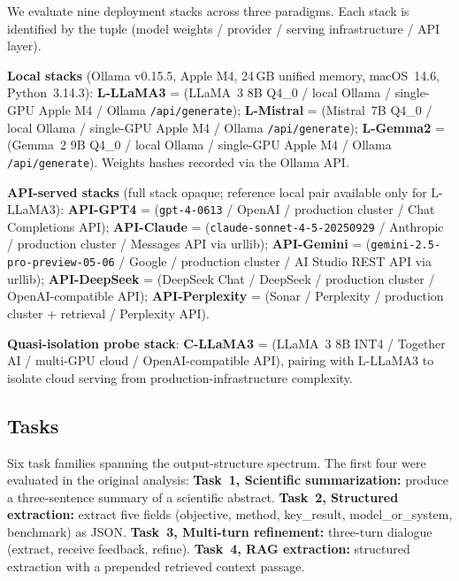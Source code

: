 \documentclass[sn-nature]{sn-jnl}
\begin{document}
We evaluate nine deployment stacks across three paradigms.
Each stack is identified by the tuple (model weights / provider / serving infrastructure / API layer).

\textbf{Local stacks} (Ollama v0.15.5, Apple M4, 24\,GB unified memory, macOS~14.6, Python~3.14.3):
\textbf{L-LLaMA3} = (LLaMA~3 8B Q4\_0\cite{grattafiori2024llama3} / local Ollama / single-GPU Apple M4 / Ollama \texttt{/api/generate});
\textbf{L-Mistral} = (Mistral~7B Q4\_0\cite{jiang2023mistral} / local Ollama / single-GPU Apple M4 / Ollama \texttt{/api/generate});
\textbf{L-Gemma2} = (Gemma~2 9B Q4\_0\cite{team2024gemma} / local Ollama / single-GPU Apple M4 / Ollama \texttt{/api/generate}).
Weights hashes recorded via the Ollama API.

\textbf{API-served stacks} (full stack opaque; reference local pair available only for L-LLaMA3):
\textbf{API-GPT4} = (\texttt{gpt-4-0613}\cite{achiam2023gpt4} / OpenAI / production cluster / Chat Completions API);
\textbf{API-Claude} = (\texttt{claude-sonnet-4-5-20250929}\cite{anthropic2024claude} / Anthropic / production cluster / Messages API via urllib);
\textbf{API-Gemini} = (\texttt{gemini-2.5-pro-preview-05-06}\cite{reid2024gemini15} / Google / production cluster / AI Studio REST API via urllib);
\textbf{API-DeepSeek} = (DeepSeek Chat / DeepSeek / production cluster / OpenAI-compatible API);
\textbf{API-Perplexity} = (Sonar / Perplexity / production cluster + retrieval / Perplexity API).

\textbf{Quasi-isolation probe stack}:
\textbf{C-LLaMA3} = (LLaMA~3 8B INT4\cite{grattafiori2024llama3} / Together AI / multi-GPU cloud / OpenAI-compatible API), pairing with L-LLaMA3 to isolate cloud serving from production-infrastructure complexity.


\subsection{Tasks}\label{subsec:tasks}

Six task families spanning the output-structure spectrum.
The first four were evaluated in the original analysis:
\textbf{Task~1, Scientific summarization:} produce a three-sentence summary of a scientific abstract.
\textbf{Task~2, Structured extraction:} extract five fields (objective, method, key\_result, model\_or\_system, benchmark) as JSON.
\textbf{Task~3, Multi-turn refinement:} three-turn dialogue (extract, receive feedback, refine).
\textbf{Task~4, RAG extraction:} structured extraction with a prepended retrieved context passage.
\end{document}
